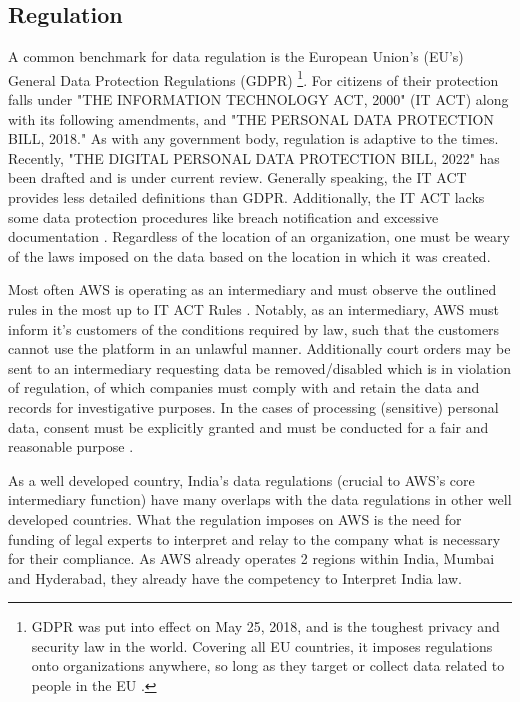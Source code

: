 \documentclass[a4paper, 12pt]{article}
\begin{document}
\subsection{Regulation}
A common benchmark for data regulation is the European Union's (EU's) General Data Protection Regulations (GDPR) \footnote{GDPR was put into effect on May 25, 2018, and is the toughest privacy and security law in the world. Covering all EU countries, it imposes regulations onto organizations anywhere, so long as they target or collect data related to people in the EU \cite{GDPR}.}. 
For citizens of their protection falls under "THE INFORMATION TECHNOLOGY ACT, 2000" (IT ACT) along with its following amendments, and "THE PERSONAL DATA PROTECTION BILL, 2018." 
As with any government body, regulation is adaptive to the times.
Recently, "THE DIGITAL PERSONAL DATA PROTECTION BILL, 2022" has been drafted and is under current review. 
Generally speaking, the IT ACT provides less detailed definitions than GDPR. 
Additionally, the IT ACT lacks some data protection procedures like breach notification and excessive documentation \cite[p.~18]{GDPR_AND_INDIA}. 
Regardless of the location of an organization, one must be weary of the laws imposed on the data based on the location in which it was created. 

Most often AWS is operating as an intermediary and must observe the outlined rules in the most up to IT ACT Rules \cite[p.~21-26]{INFORMATION_TECHNOLOGY_ACT_2021_RULES}. 
Notably, as an intermediary, AWS must inform it's customers of the conditions required by law, such that the customers cannot use the platform in an unlawful manner. 
Additionally court orders may be sent to an intermediary requesting data be removed/disabled which is in violation of regulation, of which companies must comply with and retain the data and records for investigative purposes. 
In the cases of processing (sensitive) personal data, consent must be explicitly granted and must be conducted for a fair and reasonable purpose \cite[p.14-19]{PERSONAL_DATA_PROTECTION_BILL_2018}. 

As a well developed country, India's data regulations (crucial to AWS's core intermediary function) have many overlaps with the data regulations in other well developed countries. 
What the regulation imposes on AWS is the need for funding of legal experts to interpret and relay to the company what is necessary for their compliance. 
As AWS already operates 2 regions within India, Mumbai and Hyderabad, they already have the competency to Interpret India law. 
\end{document}
